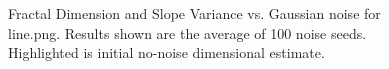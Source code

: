 \documentclass[12pt, oneside]{book}
\begin{document}
\begin{figure}[!b]
  \centering
  \caption[Fractal Dimension and Slope Variance vs. Gaussian noise for line.png.]{Fractal Dimension and Slope Variance vs. Gaussian noise for line.png.  Results shown are the average of 100 noise seeds.  Highlighted is initial no-noise dimensional estimate.}
  \label{fig:line_gaussian_result}
\end{figure}
\end{document}
